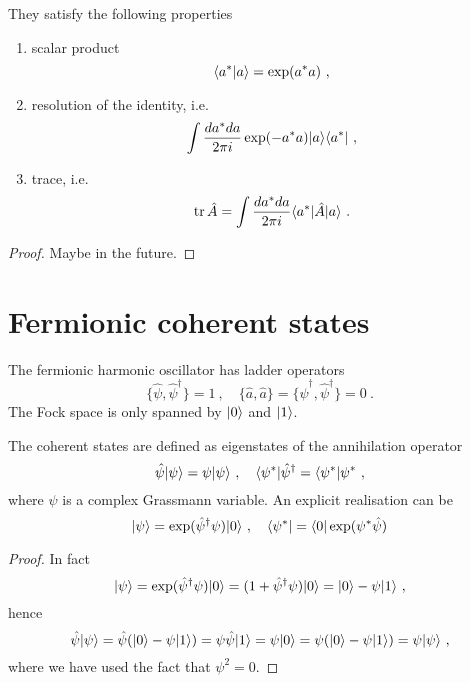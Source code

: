    They satisfy the following properties
    \begin{enumerate}
        \item scalar product
            \begin{equation*}
                \langle a^*\vert a\rangle = \exp(a^* a) ~,
            \end{equation*}
        \item resolution of the identity, i.e. 
            \begin{equation*}
                \int \frac{da^* da}{2 \pi i} \exp(- a^* a) \vert a\rangle \langle a^*\vert ~,
            \end{equation*}
        \item trace, i.e. 
            \begin{equation*}
                \operatorname{tr} \hat A = \int \frac{da^* da}{2 \pi i} \langle a^*\vert \hat A \vert a\rangle ~.
            \end{equation*}
    \end{enumerate}
    \begin{proof}
        Maybe in the future.
    \end{proof}

\section{Fermionic coherent states}

    The fermionic harmonic oscillator has ladder operators 
    \begin{equation*}
        \{\hat \psi, \hat \psi^\dagger \} = 1 ~, \quad \{\hat a, \hat a\} = \{\hat \psi^\dagger, \hat \psi^\dagger\} = 0 ~.
    \end{equation*}
    The Fock space is only spanned by $\vert0\rangle$ and $\vert1\rangle$.

    The coherent states are defined as eigenstates of the annihilation operator 
    \begin{equation*}
        \hat \psi \vert\psi\rangle = \psi \vert\psi\rangle ~, \quad \langle\psi^*\vert \hat \psi^\dagger = \langle\psi^*\vert \psi^* ~,
    \end{equation*}
    where $\psi$ is a complex Grassmann variable. An explicit realisation can be 
    \begin{equation*}
        \vert\psi\rangle = \exp(\hat \psi^\dagger \psi) \vert0\rangle ~, \quad \langle\psi^*\vert = \langle0\vert \exp(\psi^* \hat \psi)
    \end{equation*}
    \begin{proof}
        In fact 
        \begin{equation*}
            \vert\psi\rangle = \exp(\hat \psi^\dagger \psi) \vert0\rangle = (1 + \hat \psi^\dagger \psi) \vert0\rangle = \vert0\rangle - \psi \vert1\rangle ~,
        \end{equation*}
        hence 
        \begin{equation*}
            \hat \psi \vert\psi\rangle = \hat \psi (\vert0\rangle - \psi \vert1\rangle) = \psi \hat \psi \vert1\rangle = \psi \vert0\rangle = \psi (\vert0\rangle - \psi \vert1\rangle) = \psi \vert\psi\rangle ~,
        \end{equation*}
        where we have used the fact that $\psi^2 = 0$.
    \end{proof}

